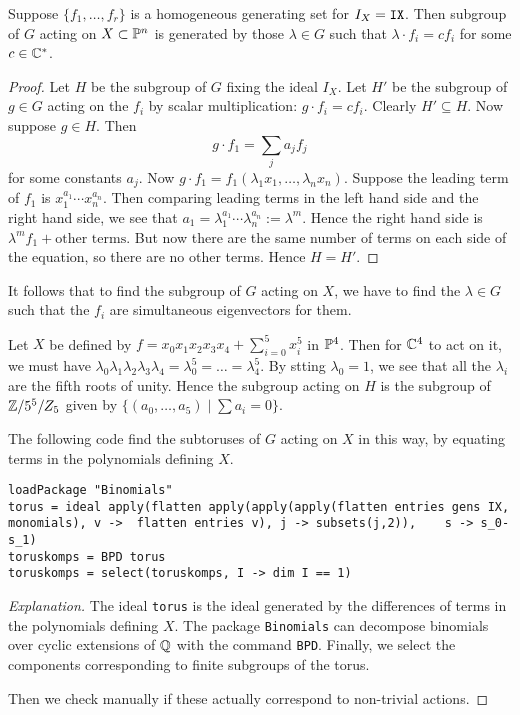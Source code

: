 \begin{lemma}
Suppose $\{ f_1,\ldots, f_r \}$ is a homogeneous generating set for $I_X=\text{\texttt{IX}}$. Then subgroup of $G$ acting on $X \subset \P^n$ is generated by those $\lambda \in G$ such that $\lambda \cdot f_i  = c f_i$ for some $c \in \C^\ast$.
\end{lemma}
\begin{proof}
Let $H$ be the subgroup of $G$ fixing the ideal $I_X$. Let $H'$ be the subgroup of $g \in G$ acting on the $f_i$ by scalar multiplication: $g \cdot f_i =c f_i$. Clearly $H' \subseteq H$.  Now suppose $g \in H$. Then
$$
g \cdot f_1 = \sum_j a_j f_j
$$
for some constants $a_j$. Now $g \cdot f_1 = f_1(\lambda_1 x _1 ,\ldots, \lambda_n x_n)$. Suppose the leading term of $f_1$ is $x_1^{a_1}\cdots x_n^{a_n}$. Then comparing leading terms in the left hand side and the right hand side, we see that $a_1 = \lambda_1^{a_1}\cdots \lambda_n^{a_n} := \lambda^m$. Hence the right hand side is $\lambda^m f_1 + \text{other terms}$. But now there are the same number of terms on each side of the equation, so there are no other terms. Hence $H=H'$. 
\end{proof}

It follows that to find the subgroup of $G$ acting on $X$, we have to find the $\lambda \in G$ such that the $f_i$ are simultaneous eigenvectors for them.

\begin{example}
Let  $X$ be defined by $f = x_0x_1x_2x_3x_4+\sum_{i=0}^5 x_i^5$ in $\P^4$. Then for $\C^4$ to act on it, we must have $\lambda_0\lambda_1\lambda_2\lambda_3\lambda_4=\lambda_0^5=\ldots=\lambda_4^5$. By stting $\lambda_0=1$, we see that all the $\lambda_i$ are the fifth roots of unity. Hence the subgroup acting on $H$ is the subgroup of $\Z/5^5/Z_5$ given by $\{ (a_0,\ldots,a_5) \mid \sum a_i = 0 \}$.
\end{example}

The following code find the subtoruses of $G$ acting on $X$ in this way, by equating terms in the polynomials defining $X$.

\begin{lstlisting}[language=Macaulay2]
loadPackage "Binomials"
torus = ideal apply(flatten apply(apply(apply(flatten entries gens IX, monomials), v ->  flatten entries v), j -> subsets(j,2)),    s -> s_0-s_1)
toruskomps = BPD torus
toruskomps = select(toruskomps, I -> dim I == 1)
\end{lstlisting}
\begin{proof}[Explanation]
The ideal \texttt{torus} is the ideal generated by the differences of terms in the polynomials defining $X$. The \MM package \texttt{Binomials} can decompose binomials over cyclic extensions of $\Q$ with the command \texttt{BPD}. Finally, we select the components corresponding to finite subgroups of the torus.

Then we check manually if these actually correspond to non-trivial actions.
\end{proof}


